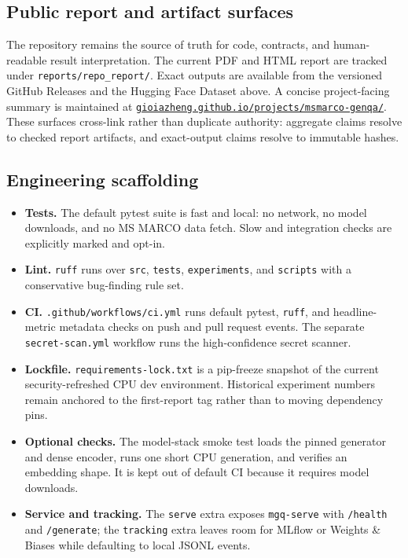 \documentclass[11pt,a4paper]{article}
\begin{document}
\subsection{Public report and artifact surfaces}

The repository remains the source of truth for code, contracts, and
human-readable result interpretation.  The current PDF and HTML report
are tracked under \texttt{reports/repo\_report/}.  Exact outputs are
available from the versioned GitHub Releases and the Hugging Face
Dataset above.  A concise project-facing summary is maintained at
\href{https://gioiazheng.github.io/projects/msmarco-genqa/}%
{\texttt{gioiazheng.github.io/projects/msmarco-genqa/}}.  These
surfaces cross-link rather than duplicate authority: aggregate claims
resolve to checked report artifacts, and exact-output claims resolve to
immutable hashes.

\subsection{Engineering scaffolding}

\begin{itemize}
  \item \textbf{Tests.}  The default pytest suite is fast and local:
        no network, no model downloads, and no MS MARCO data fetch.
        Slow and integration checks are explicitly marked and opt-in.
  \item \textbf{Lint.}  \texttt{ruff} runs over \texttt{src},
        \texttt{tests}, \texttt{experiments}, and \texttt{scripts}
        with a conservative bug-finding rule set.
  \item \textbf{CI.}  \texttt{.github/workflows/ci.yml} runs default
        pytest, \texttt{ruff}, and headline-metric metadata checks on
        push and pull request events.  The separate
        \texttt{secret-scan.yml} workflow runs the high-confidence
        secret scanner.
  \item \textbf{Lockfile.}  \texttt{requirements-lock.txt} is a
        pip-freeze snapshot of the current security-refreshed CPU dev
        environment.  Historical experiment numbers remain anchored
        to the first-report tag rather than to moving dependency pins.
  \item \textbf{Optional checks.}  The model-stack smoke test loads
        the pinned generator and dense encoder, runs one short CPU
        generation, and verifies an embedding shape.  It is kept out
        of default CI because it requires model downloads.
  \item \textbf{Service and tracking.}  The \texttt{serve} extra
        exposes \texttt{mgq-serve} with \texttt{/health} and
        \texttt{/generate}; the \texttt{tracking} extra leaves room
        for MLflow or Weights \& Biases while defaulting to local
        JSONL events.
\end{itemize}
\end{document}
